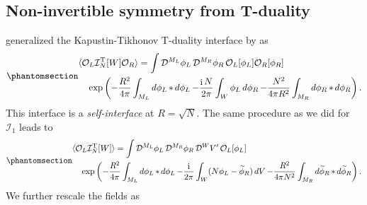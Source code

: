 \documentclass[11pt,toc=bibliography]{scrbook}
\DeclareMathOperator{\imunit}{i}
\numberwithin{equation}{section}
\DeclareMathOperator{\imunit}{i}
\begin{document}
\subsection{Non-invertible symmetry from
T-duality}\label{non-invertible-symmetry-from-t-duality}

\textcite{Choi:2021kmx} generalized the Kapustin-Tikhonov T-duality
interface by \textcite{Kapustin:2009av} as
\begin{equation}\phantomsection\label{eq-TN-interface}{
\begin{multlined}
\langle \mathcal{O}_L \mathcal{I}^\text{T}_N[W] \mathcal{O}_R  \rangle= 
\int \mathop{\mathcal{D}^{M_L}\phi_L}\mathop{\mathcal{D}^{M_R}\phi_R}
\mathcal{O}_L[\phi_L]\mathcal{O}_R[\phi_R]\\
\exp\left(-\frac{R^2}{4\pi}\int_{M_L}\mathop{d\phi_L}*\mathop{d\phi_L}
-\frac{\imunit N}{2\pi}\int_W \phi_L\mathop{d\phi_R}
-\frac{N^2}{4\pi R^2}\int_{M_R}\mathop{d\phi_R}*\mathop{d\phi_R}\right).
\end{multlined}
}\end{equation} This interface is a \emph{self-interface} at
\(R=\sqrt{N}\). The same procedure as we did for \(\mathcal{I}_1\) leads
to \begin{equation}\phantomsection\label{eq-TN-interface2}{
\begin{multlined}
\langle\mathcal{O}_L \mathcal{I}^\text{T}_N[W] \rangle= 
\int \mathop{\mathcal{D}^{M_L}\phi_L}\mathop{\mathcal{D}^{M_R}\phi_R}\mathop{\mathcal{D}^{W}V'}
\mathcal{O}_L[\phi_L]\\
\exp\left(-\frac{R^2}{4\pi}\int_{M_L}\mathop{d\phi_L}*\mathop{d\phi_L}
-\frac{\imunit }{2\pi}\int_W (N \phi_L - \widetilde{\phi}_R)\mathop{dV}
-\frac{R^2}{4\pi N^2}\int_{M_R}\mathop{d\widetilde\phi_R}*\mathop{d\widetilde\phi_R}\right).
\end{multlined}
}\end{equation} We further rescale the fields as
\end{document}
